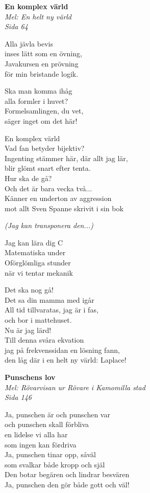 \documentclass[10pt]{article}
\newenvironment{song}[2]{
	\textbf{#1}\\
	\emph{#2}\par
	\vspace{-1mm}
}{
	\vspace{2mm}
}
\begin{document}
\begin{multicols*}{2}
\vfill
\columnbreak

\begin{song}{En komplex värld}{Mel: En helt ny värld\\Sida 64}
	Alla jävla bevis\\
	inses lätt som en övning,\\
	Javakursen en prövning\\
	för min bristande logik.

	Ska man komma ihåg\\
	alla formler i huvet?\\
	Formelsamlingen, du vet,\\
	säger inget om det här!

	En komplex värld\\
	Vad fan betyder bijektiv?\\
	Ingenting stämmer här, där allt jag lär,\\
	blir glömt snart efter tenta.\\
	Hur ska de gå?\\
	Och det är bara vecka två...\\
	Känner en underton av aggression\\
	mot allt Sven Spanne skrivit i sin bok

	\emph{(Jag kan transponera den...)}

	Jag kan lära dig C\\
	Matematiska under\\
	Oförglömliga stunder\\
	när vi tentar mekanik

	Det ska nog gå!\\
	Det sa din mamma med igår\\
	All tid tillvaratas, jag är i fas,\\
	och bor i mattehuset.\\
	Nu är jag lärd!\\
	Till denna svåra ekvation\\
	jag på frekvenssidan en lösning fann, \\
	den låg där i en helt ny värld: Laplace!
\end{song}

\begin{song}{Punschens lov}{Mel: Rövarvisan ur Rövare i Kamomilla stad\\Sida 146}
	Ja, punschen är och punschen var\\
	och punschen skall förbliva\\
	en lidelse vi alla har\\
	som ingen kan fördriva\\
	Ja, punschen tinar opp, såväl\\
	som svalkar både kropp och själ\\
	Den botar begären och lindrar besvären\\
	Ja, punschen den gör både gott och väl!
\end{song}


\end{multicols*}
\end{document}
